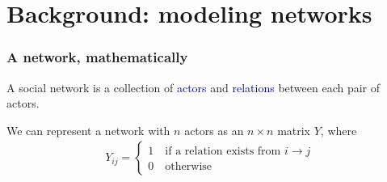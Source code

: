 \documentclass[ 10pt]{beamer}
\begin{document}
\section{Background: modeling networks}
\frame
{
\frametitle{A network, mathematically}

A social network is a collection of \textcolor{darkblue}{actors} and 
\textcolor{darkblue}{relations} between each pair of actors.  
\vspace{1mm}

We can represent a network with $n$ actors as an $n \times n$ matrix $Y$, where
\begin{align*}
	Y_{ij} =
	\begin{cases} 	1 \quad \text{if a relation exists from $i \to j$}\\
					0 \quad \text{otherwise}
	\end{cases}
\end{align*}

}
\end{document}
